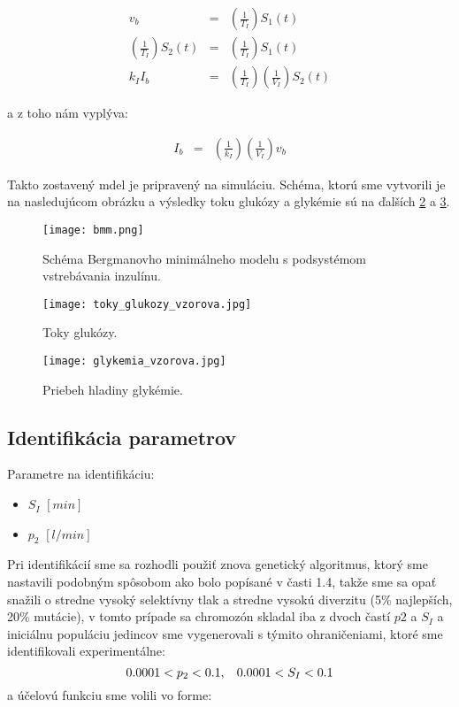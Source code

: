 \documentclass[11pt]{article} %
\begin{document}
\begin{eqnarray}
	v_b &=& \left(\frac{1}{T_I}\right) S_1(t) \\ 
	\left(\frac{1}{T_I}\right)S_2(t)  &=& \left(\frac{1}{T_I}\right)S_1(t) \\
	{k_I}I_b &=& \left(\frac{1}{T_I}\right)\left(\frac{1}{V_I}\right)S_2(t) 
\end{eqnarray}

a z toho nám vyplýva:

\begin{eqnarray}
	I_b &=& \left(\frac{1}{k_I}\right)\left(\frac{1}{V_I}\right)v_b 
\end{eqnarray}

Takto zostavený mdel je pripravený na simuláciu. Schéma, ktorú sme vytvorili je na nasledujúcom obrázku a výsledky toku glukózy a glykémie sú na ďalších \ref{fig:toky_glukozy} a \ref{fig:hladina_glykemie}.

\begin{figure}[h]
	\centering
	\texttt{[image: bmm.png]} 
	\caption{Schéma Bergmanovho minimálneho modelu s podsystémom vstrebávania inzulínu.}
	\label{fig:bmm}
\end{figure}

\begin{figure}
	\centering
	\texttt{[image: toky\_glukozy\_vzorova.jpg]} 
	\caption{Toky glukózy.}
	\label{fig:toky_glukozy}
\end{figure}

\begin{figure}
	\centering
	\texttt{[image: glykemia\_vzorova.jpg]} 
	\caption{Priebeh hladiny glykémie.}
	\label{fig:hladina_glykemie}
\end{figure}

\vspace{10mm}

\subsection{Identifikácia parametrov} \label{subsec:ids2}

Parametre na identifikáciu:
\begin{itemize}
\item $S_I$ $[min]$
\item $p_2$ $[l/min]$ 
\end{itemize}

Pri identifikácií sme sa rozhodli použiť znova genetický algoritmus, ktorý sme nastavili podobným spôsobom ako bolo popísané v časti 1.4,
takže sme sa opať snažili o stredne vysoký selektívny tlak a stredne vysokú diverzitu (5\% najlepších, 20\% mutácie), v tomto prípade sa chromozón skladal iba z dvoch častí $p2$ a $S_I$ a iniciálnu populáciu jedincov sme vygenerovali s týmito ohraničeniami, ktoré sme identifikovali experimentálne: 
\[ 0.0001 < p_2 < 0.1, \hspace{3mm} 0.0001 < S_I < 0.1 \] 
a účelovú funkciu sme volili vo forme:
\end{document}
